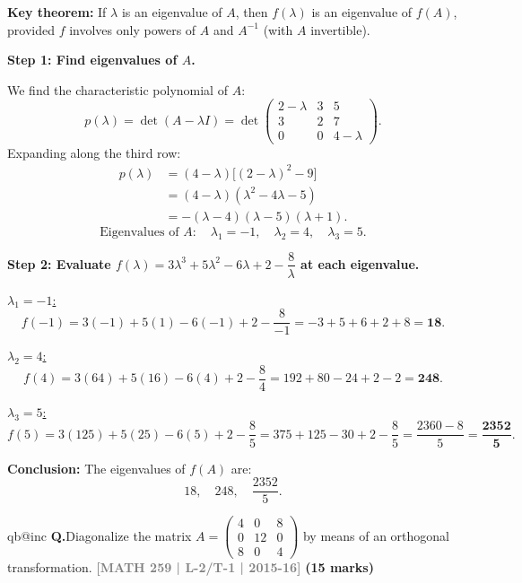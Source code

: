 \documentclass[12pt,a3paper]{article}
\makeatletter
\newcommand{\yr}[1]{\hfill\textcolor{gray}{\small\textbf{[#1]}}}
\newcommand{\mk}[1]{\textcolor{orange!70!black}{\small\textbf{(#1 marks)}}}
\newcounter{qnum}
\newcommand{\Q}[1]{%
  \csname qb@inc\endcsname
  \needspace{4\baselineskip}
  \refstepcounter{qnum}
  \vspace{6pt}
  \noindent\textbf{Q\theqnum.}\enspace #1\par
}
\makeatother
\begin{document}
\begin{tcolorbox}[enhanced,breakable,
  colback=cE!4,colframe=cE,boxrule=0.8pt,arc=5pt,
  title={\textbf{Answer --- Eigenvalues of $f(A)=3A^3+5A^2-6A+2I-8A^{-1}$}},
  fonttitle=\bfseries\color{white},colbacktitle=cE]

\textbf{Key theorem:} If $\lambda$ is an eigenvalue of $A$, then $f(\lambda)$ is an eigenvalue of $f(A)$, provided $f$ involves only powers of $A$ and $A^{-1}$ (with $A$ invertible).

\medskip
\textbf{Step 1: Find eigenvalues of $A$.}

We find the characteristic polynomial of $A$:
\[
p(\lambda) = \det(A-\lambda I) = \det\begin{pmatrix}2-\lambda&3&5\\3&2&7\\0&0&4-\lambda\end{pmatrix}.
\]
Expanding along the third row:
\begin{align*}
p(\lambda) &= (4-\lambda) \bigl[ (2-\lambda)^2 - 9 \bigr] \\
           &= (4-\lambda) ( \lambda^2 - 4\lambda - 5 ) \\
           &= -(\lambda-4)(\lambda-5)(\lambda+1).
\end{align*}
\[
\text{Eigenvalues of }A:\quad \lambda_1=-1,\quad\lambda_2=4,\quad\lambda_3=5.
\]

\textbf{Step 2: Evaluate $f(\lambda)=3\lambda^3+5\lambda^2-6\lambda+2-\dfrac{8}{\lambda}$ at each eigenvalue.}

\underline{$\lambda_1=-1$:}
\[
f(-1)=3(-1)+5(1)-6(-1)+2-\frac{8}{-1}=-3+5+6+2+8=\mathbf{18}.
\]

\underline{$\lambda_2=4$:}
\[
f(4)=3(64)+5(16)-6(4)+2-\frac{8}{4}=192+80-24+2-2=\mathbf{248}.
\]

\underline{$\lambda_3=5$:}
\[
f(5)=3(125)+5(25)-6(5)+2-\frac{8}{5}=375+125-30+2-\frac{8}{5}=\frac{2360-8}{5}=\mathbf{\dfrac{2352}{5}}.
\]

\textbf{Conclusion:} The eigenvalues of $f(A)$ are:
\[
\boxed{18,\quad 248,\quad \frac{2352}{5}.}
\]

\end{tcolorbox}

\Q{Diagonalize the matrix $A = \begin{pmatrix} 4 & 0 & 8 \\ 0 & 12 & 0 \\ 8 & 0 & 4 \end{pmatrix}$ by means of an orthogonal transformation.
\yr{MATH 259 | L-2/T-1 | 2015-16} \mk{15}}
\end{document}
